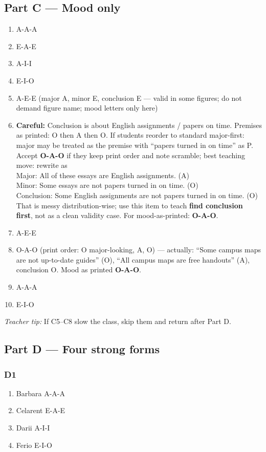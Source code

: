 \documentclass[11pt]{article}
\begin{document}
\subsection*{Part C --- Mood only}
\begin{enumerate}
\item A-A-A
\item E-A-E
\item A-I-I
\item E-I-O
\item A-E-E \quad (major A, minor E, conclusion E --- valid in some figures; do not demand figure name; mood letters only here)
\item \textbf{Careful:} Conclusion is about English assignments / papers on time. Premises as printed: O then A then O. If students reorder to standard major-first: major may be treated as the premise with ``papers turned in on time'' as P. Accept \textbf{O-A-O} if they keep print order and note scramble; best teaching move: rewrite as\\
\quad Major: All of these essays are English assignments. (A)\\
\quad Minor: Some essays are not papers turned in on time. (O)\\
\quad Conclusion: Some English assignments are not papers turned in on time. (O)\\
\quad That is messy distribution-wise; use this item to teach \textbf{find conclusion first}, not as a clean validity case. For mood-as-printed: \textbf{O-A-O}.
\item A-E-E
\item O-A-O \quad (print order: O major-looking, A, O) --- actually: ``Some campus maps are not up-to-date guides'' (O), ``All campus maps are free handouts'' (A), conclusion O. Mood as printed \textbf{O-A-O}.
\item A-A-A
\item E-I-O
\end{enumerate}
\noindent\textit{Teacher tip:} If C5--C8 slow the class, skip them and return after Part D.

\subsection*{Part D --- Four strong forms}
\subsubsection*{D1}
\begin{enumerate}
\item Barbara \quad A-A-A
\item Celarent \quad E-A-E
\item Darii \quad A-I-I
\item Ferio \quad E-I-O
\end{enumerate}
\end{document}
